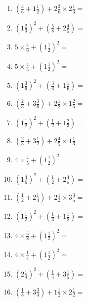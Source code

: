 \documentclass[12pt]{article}
\begin{document}
\begin{enumerate}
\newpage
\item \large $ (\frac{3}{6} + 1 \frac{1}{2}) + 2 \frac{3}{6} \times 2 \frac{1}{3} = $ \vspace{1.8cm}
\item \large $ (1 \frac{2}{3})^2 + (\frac{5}{8} + 2 \frac{4}{5}) = $ \vspace{1.8cm}
\item \large $ 5 \times \frac{4}{6} + (1 \frac{1}{2})^2 = $ \vspace{1.8cm}
\item \large $ 5 \times \frac{4}{5} + (1 \frac{1}{2})^2 = $ \vspace{1.8cm}
\item \large $ (1 \frac{3}{6})^2 + (\frac{3}{6} + 1 \frac{1}{6}) = $ \vspace{1.8cm}
\item \large $ (\frac{2}{3} + 3 \frac{3}{6}) + 2 \frac{1}{2} \times 1 \frac{2}{5} = $ \vspace{1.8cm}
\item \large $ (1 \frac{1}{2})^2 + (\frac{1}{2} + 1 \frac{2}{3}) = $ \vspace{1.8cm}
\item \large $ (\frac{2}{3} + 3 \frac{1}{2}) + 2 \frac{4}{5} \times 1 \frac{1}{3} = $ \vspace{1.8cm}
\item \large $ 4 \times \frac{4}{5} + (1 \frac{1}{2})^2 = $ \vspace{1.8cm}
\item \large $ (1 \frac{4}{6})^2 + (\frac{1}{2} + 2 \frac{4}{5}) = $ \vspace{1.8cm}
\newpage
\item \large $ (\frac{1}{2} + 2 \frac{1}{4}) + 2 \frac{1}{2} \times 3 \frac{3}{5} = $ \vspace{1.8cm}
\item \large $ (1 \frac{1}{2})^2 + (\frac{1}{3} + 1 \frac{1}{2}) = $ \vspace{1.8cm}
\item \large $ 4 \times \frac{5}{8} + (1 \frac{1}{2})^2 = $ \vspace{1.8cm}
\item \large $ 4 \times \frac{1}{4} + (1 \frac{1}{2})^2 = $ \vspace{1.8cm}
\item \large $ (2 \frac{1}{4})^2 + (\frac{1}{4} + 3 \frac{1}{5}) = $ \vspace{1.8cm}
\item \large $ (\frac{1}{8} + 3 \frac{3}{4}) + 1 \frac{1}{2} \times 2 \frac{1}{2} = $ \vspace{1.8cm}

\end{enumerate}
\end{document}
